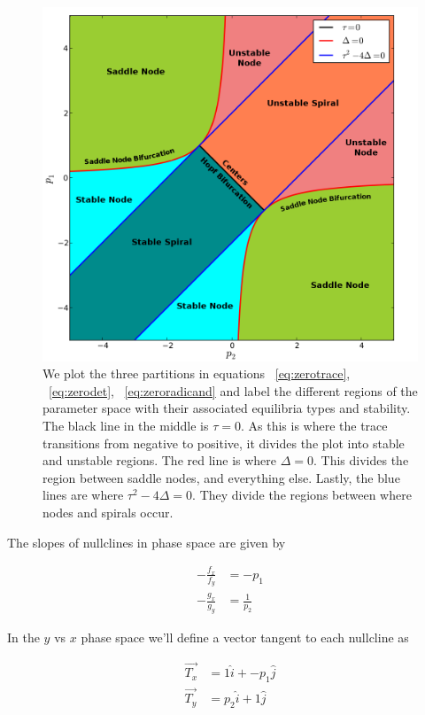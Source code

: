 \documentclass{article}
\begin{document}
\begin{figure}[h]
\centering
\includegraphics[scale=0.70]{figures/p1vsp2_full_labels.png}
\caption{We plot the three partitions in equations ~\ref{eq:zerotrace},
    ~\ref{eq:zerodet}, ~\ref{eq:zeroradicand} and label the different regions of
    the parameter space with their associated equilibria types and stability.
The black line in the middle is $\tau=0$. As this is where the trace transitions
from negative to positive, it divides the plot into stable and unstable regions.
The red line is where $\Delta=0$. This divides the region between saddle nodes,
and everything else. Lastly, the blue lines are where $\tau^2-4\Delta=0$. They
divide the regions between where nodes and spirals occur.}
\label{fig:p1vsp2}
\end{figure}

The slopes of nullclines in phase space are given by

\begin{align}
-\frac{f_x}{f_y} &= -p_1 \\
-\frac{g_x}{g_y} &= \frac{1}{p_2}
\end{align}

In the $y$ vs $x$ phase space we'll define a vector tangent to each
nullcline as

\begin{align}
\vec{T_x} &= 1\hat{i} + -p_1\hat{j} \\
\vec{T_y} &= p_2\hat{i} + 1\hat{j} 
\end{align}
\end{document}
